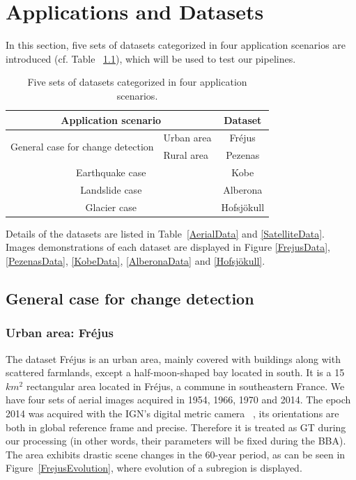 
\chapter{Applications and Datasets}
\label{chap:ApplicationsAndDatasets}
In this section, five sets of datasets categorized in four application scenarios are introduced (cf. Table ~\ref{application}), which will be used to test our pipelines.

\begin{table}[htbp]
	\centering
	\begin{tabular}{||l|l||c||}\hline
		 \multicolumn{2}{||c||}{Application scenario} & Dataset \\\hline\hline
		 \multirow{2}{*}{General case for change detection} & Urban area & Fr{\'e}jus \\
		 & Rural area & Pezenas \\\hline
		 \multicolumn{2}{||c||}{Earthquake case} & Kobe \\\hline
		 \multicolumn{2}{||c||}{Landslide case} & Alberona \\\hline
		 \multicolumn{2}{||c||}{Glacier case} & Hofsjökull \\\hline
	\end{tabular}
	\caption{Five sets of datasets categorized in four application scenarios.}
	\label{application}
\end{table}

Details of the datasets are listed in Table~\ref{AerialData} and \ref{SatelliteData}. 
Images demonstrations of each dataset are displayed in Figure \ref{FrejusData}, \ref{PezenasData}, \ref{KobeData}, \ref{AlberonaData} and \ref{Hofsjökull}.


\section{General case for change detection}
\subsection{Urban area: Fr{\'e}jus}
The dataset Fr{\'e}jus is an urban area, mainly covered with buildings along with scattered farmlands, except a half-moon-shaped bay located in south. It is a 15 $km^2$ rectangular area located in Fr{\'e}jus, a commune in southeastern France. We have four sets of aerial images acquired in 1954, 1966, 1970 and 2014. The epoch 2014 was acquired with the \ac{IGN}'s digital metric camera ~\cite{souchon2010ign}, its orientations are both in global reference frame and precise. Therefore it is treated as \ac{GT} during our processing (in other words, their parameters will be fixed during the \ac{BBA}). 
The area exhibits drastic scene changes in the 60-year period, as can be seen in Figure~\ref{FrejusEvolution}, where evolution of a subregion is displayed.\\

